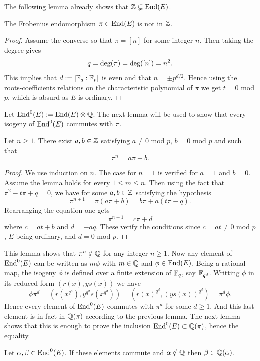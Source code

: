 \documentclass[../main/main.tex]{subfiles}
\begin{document}
The following lemma already shows that $\mathbb{Z}\subsetneq\text{End}(E)$.
\begin{lemma}
	The Frobenius endomorphism $\pi\in\text{End}(E)$ is not in $\mathbb{Z}$.
\end{lemma}
\begin{proof}
	Assume the converse so that $\pi = [n]$ for some integer $n$.
	Then taking the degree gives
	\[q=\text{deg}(\pi) = \text{deg}([n]) = n^2.\]
	This implies that $d :=[\mathbb{F}_q:\mathbb{F}_p]$ is even and that $n = \pm p^{d/2}$.
	Hence using the roots-coefficients relations on the characteristic polynomial of $\pi$ we get $t=0$ mod $p$, which is absurd as $E$ is ordinary.
\end{proof}
Let $\text{End}^0(E) := \text{End}(E)\otimes\mathbb{Q}$.
The next lemma will be used to show that every isogeny of $\text{End}^0(E)$ commutes with $\pi$.
\begin{lemma}
	Let $n\geq 1$. There exist $a, b\in\mathbb{Z}$ satisfying $a\neq 0$ mod $p$, $b = 0$ mod $p$ and such that
	\[
		\pi^n = a\pi + b.
	\]
\end{lemma}
\begin{proof}
	We use induction on $n$.
	The case for $n = 1$ is verified for $a = 1$ and $b=0$.
	Assume the lemma holds for every $1 \leq m \leq n$.
	Then using the fact that $\pi ^ 2 -t\pi + q = 0$,  we have for some $a,b\in\mathbb{Z}$ satisfying the hypothesis
	\[
		\pi^{n+1} = \pi(a\pi + b) = b\pi + a(t\pi-q).
	\]
	Rearranging the equation one gets
	\[
		\pi^{n+1} = c\pi + d
	\]
	where $c = at+b$ and $d=-aq$.
	These verify the conditions since $c = at\neq 0$ mod $p$, $E$ being ordinary,  and $d = 0$ mod $p$.
\end{proof}
This lemma shows that $\pi^n\notin\mathbb{Q}$ for any integer $n\geq 1$.
Now any element of $\text{End}^0(E)$ can be written as $m\phi$ with $m\in\mathbb{Q}$ and $\phi\in\text{End}(E)$.
Being a rational map, the isogeny $\phi$ is defined over a finite extension of $\mathbb{F}_q$, say $\mathbb{F}_{q^d}$.
Writting $\phi$ in its reduced form $(r(x), ys(x))$ we have
\[
	\phi\pi^d = (r(x^{q^d}), y^{q^d}s(x^{q^d})) = (r(x)^{q^d}, (ys(x))^{q^d}) = \pi^d\phi.
\]
Hence every element of $\text{End}^0(E)$ commutes with $\pi^d$ for some $d\geq 1$.
And this last element is in fact in $\mathbb{Q}(\pi)$ according to the previous lemma.
The next lemma shows that this is enough to prove the inclusion $\text{End}^0(E)\subset\mathbb{Q}(\pi)$, hence the equality.
\begin{lemma}
	Let $\alpha, \beta\in \text{End}^0(E)$. If these elements commute and $\alpha\notin\mathbb{Q}$ then $\beta\in\mathbb{Q}(\alpha)$.
\end{lemma}
\end{document}
